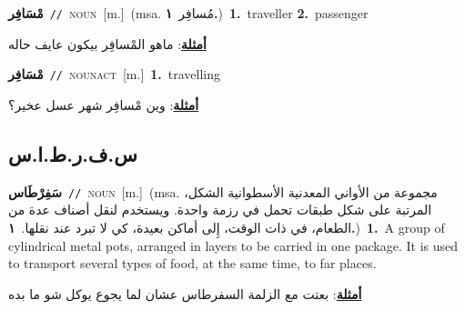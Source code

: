 \documentclass[10pt,a4paper,twoside]{article} %
\begin{document}
\begin{multicols}{2}
{\setlength\topsep{0pt}\textbf{\foreignlanguage{arabic}{مْسَافِر}}\ {\color{gray}\texttt{//}\color{black}}\ \textsc{noun}\ [m.]\ \color{gray}(msa. \foreignlanguage{arabic}{مُسافِر}~\foreignlanguage{arabic}{\textbf{١.}})\color{black}\ \textbf{1.}~traveller  \textbf{2.}~passenger\  \begin{flushright}\color{gray}\foreignlanguage{arabic}{\textbf{\underline{\foreignlanguage{arabic}{أمثلة}}}: ماهو المْسافِر بيكون عايف حاله}\end{flushright}\color{black}} \vspace{2mm}

{\setlength\topsep{0pt}\textbf{\foreignlanguage{arabic}{مْسَافِر}}\ {\color{gray}\texttt{//}\color{black}}\ \textsc{noun\textunderscore act}\ [m.]\ \textbf{1.}~travelling\  \begin{flushright}\color{gray}\foreignlanguage{arabic}{\textbf{\underline{\foreignlanguage{arabic}{أمثلة}}}: وين مْسافِر شهر عسل عخير؟}\end{flushright}\color{black}} \vspace{2mm}

\vspace{-3mm}
\subsection*{\color{blue}\foreignlanguage{arabic}{س.ف.ر.ط.ا.س}\color{blue}{ (ntws)}} 

{\setlength\topsep{0pt}\textbf{\foreignlanguage{arabic}{سَفِرْطَاس}}\ {\color{gray}\texttt{//}\color{black}}\ \textsc{noun}\ [m.]\ \color{gray}(msa. \foreignlanguage{arabic}{مجموعة من الأواني المعدنية الأسطوانية الشكل، المرتبة على شكل طبقات تحمل في رزمة واحدة. ويستخدم لنقل أصناف عدة من الطعام، في ذات الوقت، إِلى أماكن بعيدة، كي لا تبرد عند نقلها.}~\foreignlanguage{arabic}{\textbf{١.}})\color{black}\ \textbf{1.}~A group of cylindrical metal pots, arranged in layers to be carried in one package. It is used to transport several types of food, at the same time, to far places.\  \begin{flushright}\color{gray}\foreignlanguage{arabic}{\textbf{\underline{\foreignlanguage{arabic}{أمثلة}}}: بعتت مع الزلمة السفرطاس عشان لما يجوع يوكل شو ما بده}\end{flushright}\color{black}} \vspace{2mm}


\end{multicols}
\end{document}
